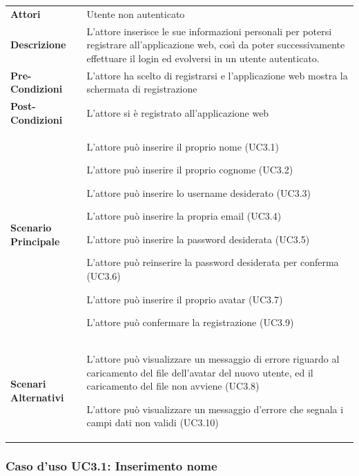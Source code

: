 \begin{longtable}{ l | p{11cm}}
	\hline
	\rowcolor{Gray}
	 \multicolumn{2}{c}{UC3 - Registrazione utente} \\
	 \hline
	\textbf{Attori} & Utente non autenticato \\
	\textbf{Descrizione} & L'attore inserisce le sue informazioni personali per potersi registrare all'applicazione web, così da poter successivamente effettuare il login ed evolversi in un utente autenticato. \\
	\textbf{Pre-Condizioni} & L'attore ha scelto di registrarsi e l'applicazione web mostra la schermata di registrazione \\
	\textbf{Post-Condizioni} & L'attore si è registrato all'applicazione web \\
	\textbf{Scenario Principale} & 
	\begin{enumerate*}[label=(\arabic*.),itemjoin={\newline}]
		\item L'attore può inserire il proprio nome (UC3.1)
		\item L'attore può inserire il proprio cognome (UC3.2)
		\item L'attore può inserire lo username desiderato (UC3.3)
		\item L'attore può inserire la propria email (UC3.4) 
		\item L'attore può inserire la password desiderata (UC3.5)
		\item L'attore può reinserire la password desiderata per conferma (UC3.6)
		\item L'attore può inserire il proprio avatar (UC3.7)
		\item L'attore può confermare la registrazione (UC3.9)
	\end{enumerate*}\\
	\textbf{Scenari Alternativi} & 
	\begin{enumerate*}[label=(\arabic*.),itemjoin={\newline}]
		\item L'attore può visualizzare un messaggio di errore riguardo al caricamento del file dell'avatar del nuovo utente, ed il caricamento del file non avviene (UC3.8)
		\item L'attore può visualizzare un messaggio d'errore che segnala i campi dati non validi (UC3.10)
	\end{enumerate*}\\
\end{longtable}

\subsubsection{Caso d'uso UC3.1: Inserimento nome}
\label{UC3_1}

